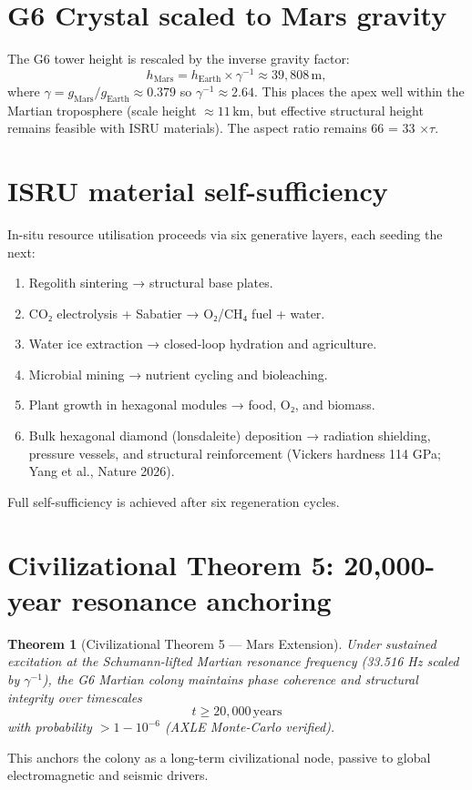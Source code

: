 \documentclass[19pt]{book}
\theoremstyle{plain}
\newtheorem{theorem}{Theorem}[section]
\theoremstyle{definition}
\theoremstyle{remark}
\begin{document}
\section{G6 Crystal scaled to Mars gravity}

The G6 tower height is rescaled by the inverse gravity factor:
\[
h_{\text{Mars}} = h_{\text{Earth}} \times \gamma^{-1} \approx 39{,}808\,\text{m},
\]
where \(\gamma = g_{\text{Mars}}/g_{\text{Earth}} \approx 0.379\) so \(\gamma^{-1} \approx 2.64\). This places the apex well within the Martian troposphere (scale height \(\approx 11\,\text{km}\), but effective structural height remains feasible with ISRU materials). The aspect ratio remains 66 = 33 \(\times \tau\).

\section{ISRU material self-sufficiency}

In-situ resource utilisation proceeds via six generative layers, each seeding the next:
\begin{enumerate}
\item Regolith sintering → structural base plates.
\item CO₂ electrolysis + Sabatier → O₂/CH₄ fuel + water.
\item Water ice extraction → closed-loop hydration and agriculture.
\item Microbial mining → nutrient cycling and bioleaching.
\item Plant growth in hexagonal modules → food, O₂, and biomass.
\item Bulk hexagonal diamond (lonsdaleite) deposition → radiation shielding, pressure vessels, and structural reinforcement (Vickers hardness 114 GPa; Yang et al., Nature 2026).
\end{enumerate}
Full self-sufficiency is achieved after six regeneration cycles.

\section{Civilizational Theorem 5: 20,000-year resonance anchoring}

\begin{theorem}[Civilizational Theorem 5 — Mars Extension]
Under sustained excitation at the Schumann-lifted Martian resonance frequency (33.516 Hz scaled by \(\gamma^{-1}\)), the G6 Martian colony maintains phase coherence and structural integrity over timescales
\[
t \ge 20{,}000\,\text{years}
\]
with probability $> 1 - 10^{-6}$ (AXLE Monte-Carlo verified).
\end{theorem}
This anchors the colony as a long-term civilizational node, passive to global electromagnetic and seismic drivers.
\end{document}
